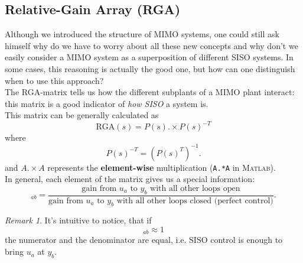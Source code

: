 \documentclass[a4paper,12 pt]{article}
\numberwithin{equation}{section}
\theoremstyle{definition}
\theoremstyle{remark}
\newtheorem*{bmk}{Remark}
\theoremstyle{definition}
\theoremstyle{definition}
\theoremstyle{definition}
\theoremstyle{remark}
\begin{document}
\subsection{Relative-Gain Array (RGA)}
Although we introduced the structure of MIMO systems, one could still ask himself why do we have to worry about all these new concepts and why don't we easily consider a MIMO system as a superposition of different SISO systems. In some cases, this reasoning is actually the good one, but how can one distinguish when to use this approach? \\
The RGA-matrix tells us how the different subplants of a MIMO plant interact: this matrix is a good indicator of \textit{how SISO} a system is. \\
This matrix can be generally calculated as
\begin{equation}
\text{RGA}(s)=P(s).\times P(s)^{-T}
\end{equation}
where
\begin{equation}
P(s)^{-T}=(P(s)^T)^{-1}.
\end{equation}
and 
$A.\times A$ represents the \textbf{element-wise} multiplication (\verb+A.*A+ in \textsc{Matlab}). \\
In general, each element of the matrix gives us a special information:
\begin{equation}
[\text{RGA}]_{ab}=\frac{\text{gain from $u_a$ to $y_b$ with all other loops open}}{\text{gain from $u_a$ to $y_b$ with all other loops closed (perfect control)}}.
\end{equation}
\begin{bmk}
It's intuitive to notice, that if 
\begin{equation}
[\text{RGA}]_{ab}\approx 1
\end{equation}
the numerator and the denominator are equal, i.e. SISO control is enough to bring $u_a$ at $y_b$.
\end{bmk}
\end{document}
